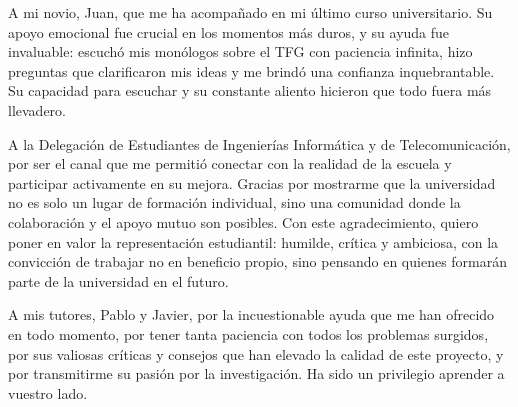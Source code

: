 A mi novio, Juan, que me ha acompañado en mi último curso universitario. Su apoyo emocional fue crucial en los momentos más duros, y su ayuda fue invaluable: escuchó mis monólogos sobre el TFG con paciencia infinita, hizo preguntas que clarificaron mis ideas y me brindó una confianza inquebrantable. Su capacidad para escuchar y su constante aliento hicieron que todo fuera más llevadero. 

A la Delegación de Estudiantes de Ingenierías Informática y de Telecomunicación, por ser el canal que me permitió conectar con la realidad de la escuela y participar activamente en su mejora. Gracias por mostrarme que la universidad no es solo un lugar de formación individual, sino una comunidad donde la colaboración y el apoyo mutuo son posibles. Con este agradecimiento, quiero poner en valor la representación estudiantil: humilde, crítica y ambiciosa, con la convicción de trabajar no en beneficio propio, sino pensando en quienes formarán parte de la universidad en el futuro.

A mis tutores, Pablo y Javier, por la incuestionable ayuda que me han ofrecido en todo momento, por tener tanta paciencia con todos los problemas surgidos, por sus valiosas críticas y consejos que han elevado la calidad de este proyecto, y por transmitirme su pasión por la investigación. Ha sido un privilegio aprender a vuestro lado.